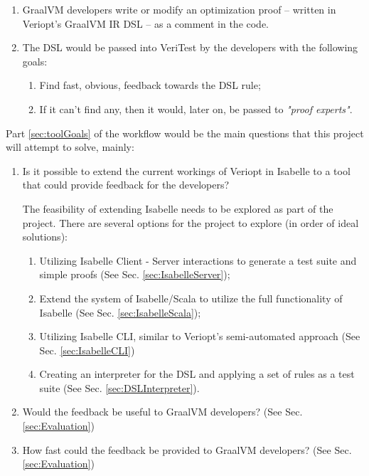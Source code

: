 \begin{enumerate}
    \item GraalVM developers write or modify an optimization proof -- written in Veriopt's GraalVM IR DSL -- as a comment in the code.
    \item The DSL would be passed into VeriTest by the developers with the following goals:
        
          \label{sec:toolGoals}
          \begin{enumerate}
            \item Find fast, obvious, feedback towards the DSL rule;
            \item If it can't find any, then it would, later on, be passed to \emph{"proof experts"}.
          \end{enumerate}
\end{enumerate}

Part \ref{sec:toolGoals} of the workflow would be the main questions that this project will attempt to solve, mainly:

\begin{enumerate}
    \item Is it possible to extend the current workings of Veriopt in Isabelle to a tool that could provide feedback for the developers?    
    
          The feasibility of extending Isabelle needs to be explored as part of the project. There are several options for the project to explore 
          (in order of ideal solutions):
          \begin{enumerate}
              \item Utilizing Isabelle Client - Server interactions \cite[Ch. 4]{isabelleSystem} to generate a test suite and 
                    simple proofs \cite{isabelleQuickcheck,isabelleProof,isabelleNitpick,isabelleSledgehammer} (See Sec. \ref{sec:IsabelleServer});
              \item Extend the system of Isabelle/Scala to utilize the full functionality of Isabelle \cite[Ch. 5]{isabelleSystem}
                    (See Sec. \ref{sec:IsabelleScala});
              \item Utilizing Isabelle CLI, similar to Veriopt's semi-automated approach \cite[Sec. 5.1]{Term_Graph_Optimizations} 
                    (See Sec. \ref{sec:IsabelleCLI})
              \item Creating an interpreter for the DSL and applying a set of rules as a test suite (See Sec. \ref{sec:DSLInterpreter}).
          \end{enumerate}

    \item Would the feedback be useful to GraalVM developers? (See Sec. \ref{sec:Evaluation})
    \item How fast could the feedback be provided to GraalVM developers? (See Sec. \ref{sec:Evaluation})
\end{enumerate}

